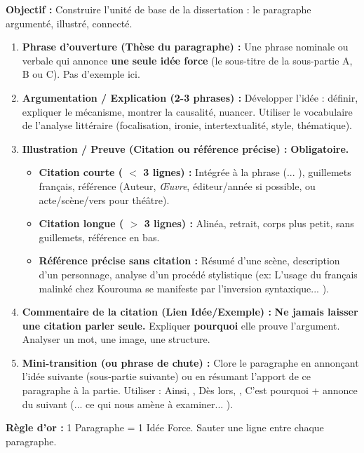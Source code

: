 \documentclass[11pt]{article}
\newcommand{\cle}[1]{{\popxbold\color{popdark}#1}}
\begin{document}
\begin{methode}
    \textbf{Objectif :} Construire l'unité de base de la dissertation : le paragraphe \cle{argumenté}, \cle{illustré}, \cle{connecté}.
    \begin{enumerate}
        \item \textbf{Phrase d'ouverture (Thèse du paragraphe) :} Une phrase nominale ou verbale qui annonce \textbf{une seule idée force} (le \og sous-titre \fg de la sous-partie A, B ou C). Pas d'exemple ici.
        \item \textbf{Argumentation / Explication (2-3 phrases) :} Développer l'idée : définir, expliquer le mécanisme, montrer la causalité, nuancer. Utiliser le vocabulaire de l'analyse littéraire (focalisation, ironie, intertextualité, style, thématique).
        \item \textbf{Illustration / Preuve (Citation ou référence précise) :} \textbf{Obligatoire.}
            \begin{itemize}
                \item \textbf{Citation courte ( $<$ 3 lignes) :} Intégrée à la phrase (\og ... \fg), guillemets français, référence (Auteur, \emph{Œuvre}, éditeur/année si possible, ou acte/scène/vers pour théâtre).
                \item \textbf{Citation longue ( $>$ 3 lignes) :} Alinéa, retrait, corps plus petit, sans guillemets, référence en bas.
                \item \textbf{Référence précise sans citation :} Résumé d'une scène, description d'un personnage, analyse d'un procédé stylistique (ex: \og L'usage du français malinké chez Kourouma se manifeste par l'inversion syntaxique... \fg).
            \end{itemize}
        \item \textbf{Commentaire de la citation (Lien Idée/Exemple) :} \textbf{Ne jamais laisser une citation parler seule.} Expliquer \textbf{pourquoi} elle prouve l'argument. Analyser un mot, une image, une structure.
        \item \textbf{Mini-transition (ou phrase de chute) :} Clore le paragraphe en annonçant l'idée suivante (sous-partie suivante) ou en résumant l'apport de ce paragraphe à la partie. Utiliser : \og Ainsi, \fg, \og Dès lors, \fg, \og C'est pourquoi \fg + annonce du suivant (\og ... ce qui nous amène à examiner... \fg).
    \end{enumerate}
    \textbf{Règle d'or :} 1 Paragraphe = 1 Idée Force. Sauter une ligne entre chaque paragraphe.
\end{methode}
\end{document}
